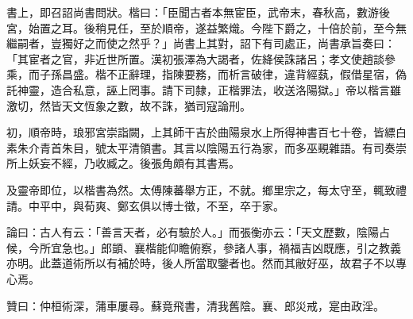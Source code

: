 \begin{pinyinscope}
書上，即召詔尚書問狀。楷曰：「臣聞古者本無宦臣，武帝末，春秋高，數游後宮，始置之耳。後稍見任，至於順帝，遂益繁熾。今陛下爵之，十倍於前，至今無繼嗣者，豈獨好之而使之然乎？」尚書上其對，詔下有司處正，尚書承旨奏曰：「其宦者之官，非近世所置。漢初張澤為大謁者，佐絳侯誅諸呂；孝文使趙談參乘，而子孫昌盛。楷不正辭理，指陳要務，而析言破律，違背經蓺，假借星宿，偽託神靈，造合私意，誣上罔事。請下司隸，正楷罪法，收送洛陽獄。」帝以楷言雖激切，然皆天文恆象之數，故不誅，猶司寇論刑。

初，順帝時，琅邪宮崇詣闕，上其師干吉於曲陽泉水上所得神書百七十卷，皆縹白素朱介青首朱目，號太平清領書。其言以陰陽五行為家，而多巫覡雜語。有司奏崇所上妖妄不經，乃收臧之。後張角頗有其書焉。

及靈帝即位，以楷書為然。太傅陳蕃舉方正，不就。鄉里宗之，每太守至，輒致禮請。中平中，與荀爽、鄭玄俱以博士徵，不至，卒于家。

論曰：古人有云：「善言天者，必有驗於人。」而張衡亦云：「天文歷數，陰陽占候，今所宜急也。」郎顗、襄楷能仰瞻俯察，參諸人事，禍福吉凶既應，引之教義亦明。此蓋道術所以有補於時，後人所當取鑒者也。然而其敝好巫，故君子不以專心焉。

贊曰：仲桓術深，蒲車屢尋。蘇竟飛書，清我舊陰。襄、郎災戒，寔由政淫。


\end{pinyinscope}